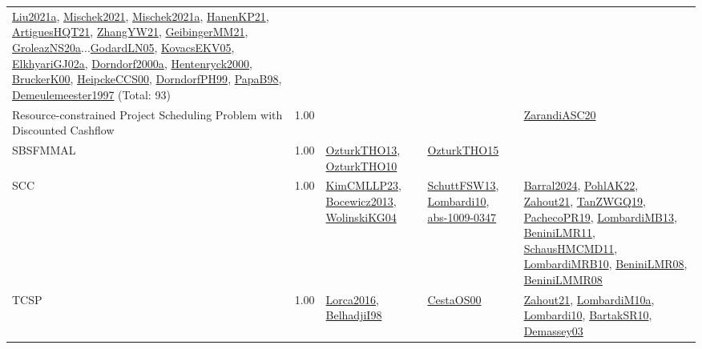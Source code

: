 {\begin{longtable}{p{3cm}r>{\raggedright\arraybackslash}p{6cm}>{\raggedright\arraybackslash}p{6cm}>{\raggedright\arraybackslash}p{8cm}}
\hyperref[detail:Liu2021a]{Liu2021a}, \hyperref[detail:Mischek2021]{Mischek2021}, \hyperref[detail:Mischek2021a]{Mischek2021a}, \hyperref[detail:HanenKP21]{HanenKP21}, \hyperref[detail:ArtiguesHQT21]{ArtiguesHQT21}, \hyperref[detail:ZhangYW21]{ZhangYW21}, \hyperref[detail:GeibingerMM21]{GeibingerMM21}, \hyperref[detail:GroleazNS20a]{GroleazNS20a}...\hyperref[detail:GodardLN05]{GodardLN05}, \hyperref[detail:KovacsEKV05]{KovacsEKV05}, \hyperref[detail:ElkhyariGJ02a]{ElkhyariGJ02a}, \hyperref[detail:Dorndorf2000a]{Dorndorf2000a}, \hyperref[detail:Hentenryck2000]{Hentenryck2000}, \hyperref[detail:BruckerK00]{BruckerK00}, \hyperref[detail:HeipckeCCS00]{HeipckeCCS00}, \hyperref[detail:DorndorfPH99]{DorndorfPH99}, \hyperref[detail:PapaB98]{PapaB98}, \hyperref[detail:Demeulemeester1997]{Demeulemeester1997} (Total: 93)\\
\index{Resource-constrained Project Scheduling Problem with Discounted Cashflow}\index{Classification!Resource-constrained Project Scheduling Problem with Discounted Cashflow}Resource-constrained Project Scheduling Problem with Discounted Cashflow &  1.00 &  &  & \hyperref[detail:ZarandiASC20]{ZarandiASC20}\\
\index{SBSFMMAL}\index{Classification!SBSFMMAL}SBSFMMAL &  1.00 & \hyperref[detail:OzturkTHO13]{OzturkTHO13}, \hyperref[detail:OzturkTHO10]{OzturkTHO10} & \hyperref[detail:OzturkTHO15]{OzturkTHO15} & \\
\index{SCC}\index{Classification!SCC}SCC &  1.00 & \hyperref[detail:KimCMLLP23]{KimCMLLP23}, \hyperref[detail:Bocewicz2013]{Bocewicz2013}, \hyperref[detail:WolinskiKG04]{WolinskiKG04} & \hyperref[detail:SchuttFSW13]{SchuttFSW13}, \hyperref[detail:Lombardi10]{Lombardi10}, \hyperref[detail:abs-1009-0347]{abs-1009-0347} & \hyperref[detail:Barral2024]{Barral2024}, \hyperref[detail:PohlAK22]{PohlAK22}, \hyperref[detail:Zahout21]{Zahout21}, \hyperref[detail:TanZWGQ19]{TanZWGQ19}, \hyperref[detail:PachecoPR19]{PachecoPR19}, \hyperref[detail:LombardiMB13]{LombardiMB13}, \hyperref[detail:BeniniLMR11]{BeniniLMR11}, \hyperref[detail:SchausHMCMD11]{SchausHMCMD11}, \hyperref[detail:LombardiMRB10]{LombardiMRB10}, \hyperref[detail:BeniniLMR08]{BeniniLMR08}, \hyperref[detail:BeniniLMMR08]{BeniniLMMR08}\\
\index{TCSP}\index{Classification!TCSP}TCSP &  1.00 & \hyperref[detail:Lorca2016]{Lorca2016}, \hyperref[detail:BelhadjiI98]{BelhadjiI98} & \hyperref[detail:CestaOS00]{CestaOS00} & \hyperref[detail:Zahout21]{Zahout21}, \hyperref[detail:LombardiM10a]{LombardiM10a}, \hyperref[detail:Lombardi10]{Lombardi10}, \hyperref[detail:BartakSR10]{BartakSR10}, \hyperref[detail:Demassey03]{Demassey03}\\

\end{longtable}}
